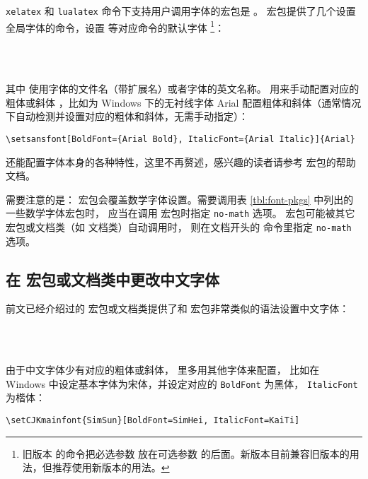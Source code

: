 \texttt{xelatex} 和 \texttt{lualatex} 命令下支持用户调用字体的宏包是 。
宏包提供了几个设置全局字体的命令，设置  等对应命令的默认字体%
\footnote{旧版本  的命令把必选参数  放在可选参数  的后面。新版本目前兼容旧版本的用法，但推荐使用新版本的用法。}：
\begin{command}
 \\
 \\
\end{command}
其中  使用字体的文件名（带扩展名）或者字体的英文名称。 用来手动配置对应的粗体或斜体
，比如为 Windows 下的无衬线字体 Arial 配置粗体和斜体（通常情况下自动检测并设置对应的粗体和斜体，无需手动指定）：
\begin{verbatim}
\setsansfont[BoldFont={Arial Bold}, ItalicFont={Arial Italic}]{Arial}
\end{verbatim}
 还能配置字体本身的各种特性，这里不再赘述，感兴趣的读者请参考  宏包的帮助文档。

需要注意的是： 宏包会覆盖数学字体设置。需要调用表 \ref{tbl:font-pkgs} 中列出的一些数学字体宏包时，
应当在调用  宏包时指定 \texttt{no-math} 选项。 宏包可能被其它宏包或文档类（如  文档类）自动调用时，
则在文档开头的  命令里指定 \texttt{no-math} 选项。

\subsection{在  宏包或文档类中更改中文字体}\label{subsec:CJKfont}

前文已经介绍过的  宏包或文档类提供了和  宏包非常类似的语法设置中文字体：
\begin{command}
 \\
 \\
\end{command}

由于中文字体少有对应的粗体或斜体， 里多用其他字体来配置，
比如在 Windows 中设定基本字体为宋体，并设定对应的 \texttt{BoldFont} 为黑体， \texttt{ItalicFont} 为楷体：
\begin{verbatim}
\setCJKmainfont{SimSun}[BoldFont=SimHei, ItalicFont=KaiTi]
\end{verbatim}

